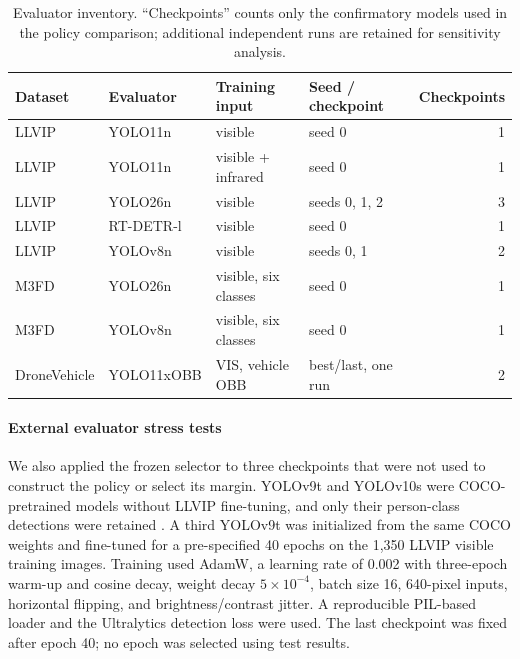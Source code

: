\documentclass[preprint,11pt]{elsarticle}
\begin{document}
\begin{table}[t]
\centering
\small
\caption{Evaluator inventory. ``Checkpoints'' counts only the confirmatory
models used in the policy comparison; additional independent runs are retained
for sensitivity analysis.}
\label{tab:evaluators}
\begin{tabular}{@{}>{\raggedright\arraybackslash}p{1.65cm}
>{\raggedright\arraybackslash}p{2.35cm}
>{\raggedright\arraybackslash}p{2.6cm}
>{\raggedright\arraybackslash}p{2.65cm}r@{}}
\toprule
Dataset & Evaluator & Training input & Seed / checkpoint & Checkpoints \\
\midrule
LLVIP & YOLO11n & visible & seed 0 & 1 \\
LLVIP & YOLO11n & visible + infrared & seed 0 & 1 \\
LLVIP & YOLO26n & visible & seeds 0, 1, 2 & 3 \\
LLVIP & RT-DETR-l & visible & seed 0 & 1 \\
LLVIP & YOLOv8n & visible & seeds 0, 1 & 2 \\
M3FD & YOLO26n & visible, six classes & seed 0 & 1 \\
M3FD & YOLOv8n & visible, six classes & seed 0 & 1 \\
Drone\-Vehicle & YOLO11x\-OBB & VIS, vehicle OBB & best/last, one run & 2 \\
\bottomrule
\end{tabular}
\end{table}

\paragraph{External evaluator stress tests}
We also applied the frozen selector to three checkpoints that were not used to
construct the policy or select its margin. YOLOv9t and YOLOv10s were
COCO-pretrained models without LLVIP fine-tuning, and only their person-class
detections were retained \cite{wang2024yolov9,wang2024yolov10}. A third
YOLOv9t was initialized from the same COCO weights and fine-tuned for a
pre-specified 40 epochs on the 1,350 LLVIP visible training images. Training
used AdamW, a learning rate of 0.002 with three-epoch warm-up and cosine decay,
weight decay \(5\times10^{-4}\), batch size 16, 640-pixel inputs, horizontal
flipping, and brightness/contrast jitter. A reproducible PIL-based loader and
the Ultralytics detection loss were used. The last checkpoint was fixed after
epoch 40; no epoch was selected using test results.
\end{document}
